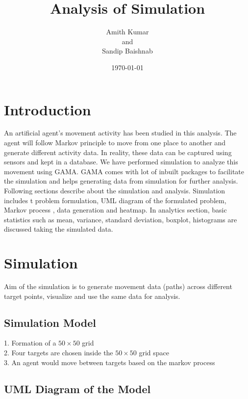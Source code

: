 \documentclass[11pt]{report}
\title{\color{cyan} Analysis of Simulation}
\author{Amith Kumar\\and \\Sandip Baishnab}
\date{\today}
\begin{document}
\maketitle
\tableofcontents
\newpage
\section{\color{cyan} Introduction}
An artificial agent's movement activity has been studied in this analysis. The agent will follow Markov principle to move from one place to another and generate different activity data. In reality, these data can be captured using sensors and kept in a database. We have performed simulation to analyze this movement using GAMA. GAMA comes with lot of inbuilt packages to facilitate the simulation and helps generating data from simulation for further analysis. Following sections describe about the simulation and analysis. Simulation includes t problem formulation, UML diagram of the formulated problem, Markov process , data generation and heatmap. In analytics section, basic statistics such as mean, variance, standard deviation, boxplot, histograms are discussed taking the simulated data.      

\section{\color{cyan} Simulation }
Aim of the simulation is to generate movement data (paths) across different target points, visualize and use the same data for analysis.
\subsection{Simulation Model}
1. Formation of a $50\times 50$ grid\\
2. Four targets are chosen inside the $50\times 50$ grid space\\
3. An agent would move between targets based on the markov process\\
\subsection{UML Diagram of the Model}
\end{document}
